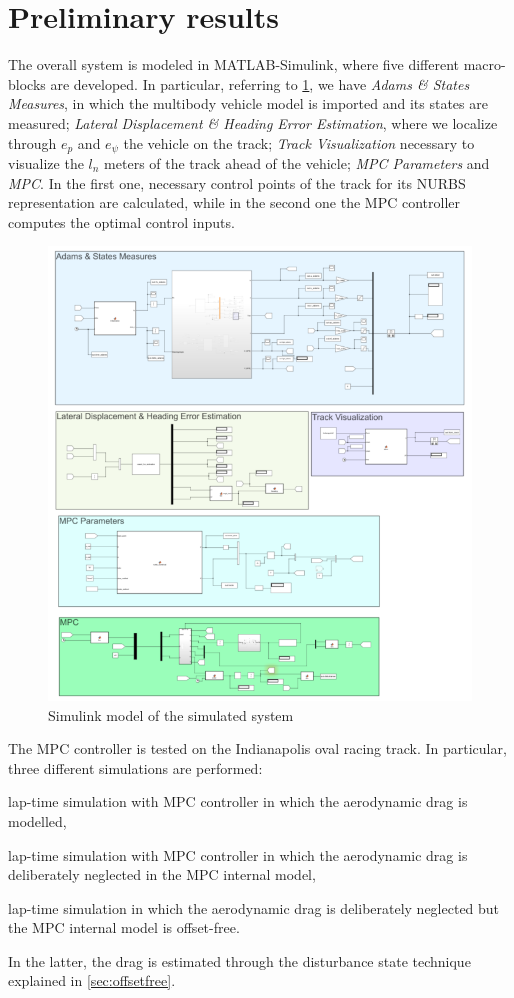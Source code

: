 \documentclass[conference]{IEEEtran} %
\begin{document}
\section{Preliminary results}
The overall system is modeled in MATLAB-Simulink, where five different macro-blocks are developed. In particular, referring to \ref{fig:simulink_blocks}, we have \textit{Adams \& States Measures}, in which the multibody vehicle model is imported and its states are measured; \textit{Lateral Displacement \& Heading Error Estimation}, where we localize through $e_p$ and $e_\psi$ the vehicle on the track; \textit{Track Visualization} necessary to visualize the $l_n$ meters of the track ahead of the vehicle; \textit{MPC Parameters} and \textit{MPC}. In the first one, necessary control points of the track for its NURBS~\cite{nurbs} representation are calculated, while in the second one the MPC controller computes the optimal control inputs.
\begin{figure}[htb] \centering
	\includegraphics[width=1.\linewidth]{simulink_blocks}
	\caption{Simulink model of the simulated system}
	\label{fig:simulink_blocks}
\end{figure}
The MPC controller is tested on the Indianapolis oval racing track. In particular, three different simulations are performed:
\begin{enumerate*}[label=(\roman*)]
	\item lap-time simulation with MPC controller in which the aerodynamic drag is modelled,
	\item lap-time simulation with MPC controller in which the aerodynamic drag is deliberately neglected in the MPC internal model,
	\item lap-time simulation in which the aerodynamic drag is deliberately neglected but the MPC internal model is offset-free.
\end{enumerate*}
In the latter, the drag is estimated through the disturbance state technique explained in \ref{sec:offsetfree}.
\end{document}
